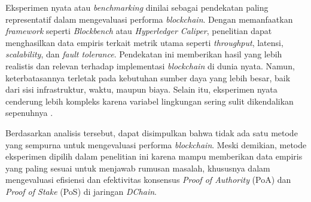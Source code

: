 Eksperimen nyata atau \textit{benchmarking} dinilai sebagai pendekatan paling representatif dalam mengevaluasi performa \textit{blockchain}. Dengan memanfaatkan \textit{framework} seperti \textit{Blockbench} atau \textit{Hyperledger Caliper}, penelitian dapat menghasilkan data empiris terkait metrik utama seperti \textit{throughput}, latensi, \textit{scalability}, dan \textit{fault tolerance}. Pendekatan ini memberikan hasil yang lebih realistis dan relevan terhadap implementasi \textit{blockchain} di dunia nyata. Namun, keterbatasannya terletak pada kebutuhan sumber daya yang lebih besar, baik dari sisi infrastruktur, waktu, maupun biaya. Selain itu, eksperimen nyata cenderung lebih kompleks karena variabel lingkungan sering sulit dikendalikan sepenuhnya \cite{fan2020, cao2021}.

Berdasarkan analisis tersebut, dapat disimpulkan bahwa tidak ada satu metode yang sempurna untuk mengevaluasi performa \textit{blockchain}. Meski demikian, metode eksperimen dipilih dalam penelitian ini karena mampu memberikan data empiris yang paling sesuai untuk menjawab rumusan masalah, khususnya dalam mengevaluasi efisiensi dan efektivitas konsensus \textit{Proof of Authority} (PoA) dan \textit{Proof of Stake} (PoS) di jaringan \textit{DChain}.

\begin{table}[H]
\centering
\caption{Perbandingan Kelebihan dan Kekurangan Berbagai Metode Evaluasi Blockchain}
\label{tab:metode_perbandingan}
\end{table}

